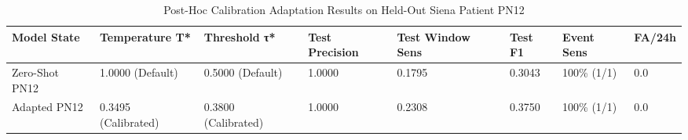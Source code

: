 \begin{table}[t]
\centering
\caption{Post-Hoc Calibration Adaptation Results on Held-Out Siena Patient PN12}
\label{tab:domain_adaptation}
\small
\begin{tabular}{llllllll}
\toprule
Model State & Temperature T* & Threshold τ* & Test Precision & Test Window Sens & Test F1 & Event Sens & FA/24h \\
\midrule
Zero-Shot PN12 & 1.0000 (Default) & 0.5000 (Default) & 1.0000 & 0.1795 & 0.3043 & 100\% (1/1) & 0.0 \\
Adapted PN12 & 0.3495 (Calibrated) & 0.3800 (Calibrated) & 1.0000 & 0.2308 & 0.3750 & 100\% (1/1) & 0.0 \\
\bottomrule
\end{tabular}
\end{table}
